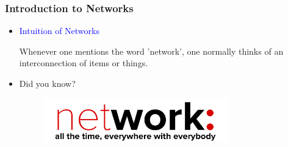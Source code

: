 \documentclass{beamer}
\begin{document}
\begin{frame}
	\frametitle{Introduction to Networks}
	
	\begin{itemize}
		\item \textcolor{blue}{Intuition of Networks}
		
		Whenever one mentions the word 'network', one normally thinks of an interconnection of items or things.
		\pause
		\item Did you know?
			\begin{figure}[!h]
				\centering
				\includegraphics[width=0.75\textwidth]{images/networkeverywhere.png}
			\end{figure}
		\end{itemize}
	\end{frame}
\end{document}
